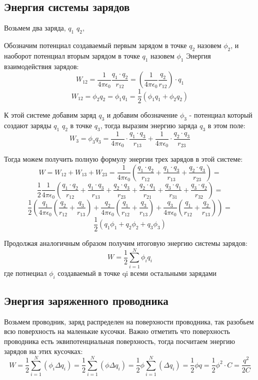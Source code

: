\documentclass[../main.tex]{subfiles}
\begin{document}
\subsection{Энергия системы зарядов}
Возьмем два заряда, $q_1$ $q_2$,

Обозначим потенциал создаваемый первым зарядом в точке $q_2$ назовем $\phi_2$, и наоборот потенциал вторым зарядом в точке $q_1$ назовем $\phi_1$
Энергия взаимодействия зарядов:
\[W_{12} = \frac{1}{4 \pi \epsilon_0} \frac{q_1 \cdot q_2}{r_{12}} = (\frac{1}{4 \pi \epsilon_0} \frac{q_2}{r_{12}}) \cdot q_1\]
\[W_{12} = \phi_2 q_2 = \phi_1 q_1 = \frac{1}{2} (\phi_1 q_1 + \phi_2 q_2)\]

К этой системе добавим заряд $q_3$ и добавим обозначение $\phi_3$ - потенциал который создают заряды $q_1$ $q_2$ в точке $q_3$,
тогда выразим энергию заряда $q_3$ в этом поле:
\[W_3 = \phi_3 q_3 = \frac{1}{4 \pi \epsilon_0} \cdot \frac{q_1 \cdot q_3}{r_{13}} + \frac{1}{4 \pi \epsilon_0} \cdot \frac{q_2 \cdot q_3}{r_{23}}\]

Тогда можем получить полную формулу энергии трех зарядов в этой системе:
\[W = W_{12} + W_{13} + W_{23} = \frac{1}{4 \pi \epsilon_0} (\frac{q_1 \cdot q_2}{r_{12}} + \frac{q_1 \cdot q_3}{r_{13}}+ \frac{q_2 \cdot q_3}{r_{23}}) = \]
\[ \frac{1}{2}\frac{1}{4 \pi \epsilon_0}(\frac{q_1 \cdot q_2}{r_{12}} + \frac{q_1 \cdot q_3}{r_{13}}+ \frac{q_2 \cdot q_3}{r_{23}} + \frac{q_2 \cdot q_1}{r_{21}} + \frac{q_3 \cdot q_1}{r_{31}}+ \frac{q_3 \cdot q_2}{r_{32}}) = \]
\[ \frac{1}{2}(\frac{q_1}{4 \pi \epsilon_0}(\frac{q_2}{r_{12}} + \frac{q_3}{r_{13}}) + \frac{q_2}{4 \pi \epsilon_0}(\frac{q_1}{r_{12}} + \frac{q_3}{r_{13}}) + \frac{q_3}{4 \pi \epsilon_0}(\frac{q_1}{r_{12}} + \frac{q_2}{r_{13}}) ) = \]
\[ \frac{1}{2} (q_1 \phi_1 + q_2 \phi_2  + q_3 \phi_3) \]

Продолжая аналогичным образом получим итоговую энергию системы зарядов:
\[W = \frac{1}{2} \sum_{i=1}^{N} \phi_i q_i\]
где потнециал $\phi_i$ создаваемый в точке qi всеми остальными зарядами

\subsection{Энергия заряженного проводника}
Возьмем проводник, заряд распределен на поверхности проводника, так разобьем всю поверхность на маленькие кусочки.
Важно отметить что поверхность проводника есть эквипотенциальная поверхность, тогда посчитаем энергию зарядов на этих кусочках:
\[W = \frac{1}{2} \sum_{i=1}^{N} (\phi_i \Delta q_i) = \frac{1}{2} \sum_{i=1}^{N} (\phi \Delta q_i) =
    \frac{1}{2} \phi \sum_{i=1}^{N} (\Delta q_i) = \frac{1}{2} \phi q = \frac{1}{2} \phi^2 \cdot C = \frac{q^2}{2C}
\]
\end{document}
